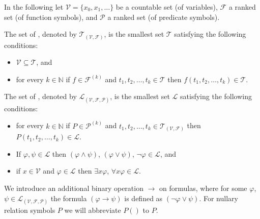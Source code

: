In the following let $\mathcal{V}=\{x_0,x_1,\dots\}$ be a countable set (of variables), $\mathcal{F}$ a ranked set (of function symbols), and $\mathcal{P}$ a ranked set (of predicate symbols).
\begin{definition}
	The set of , denoted by $\mathcal{T}_{(\mathcal{V},\mathcal{F})}$, is the smallest set $\mathcal{T}$ satisfying the following conditions:
	\begin{itemize}
		\item $\mathcal{V} \subseteq \mathcal{T}$, and
		\item for every $k\in\mathbb{N}$ if $f\in\mathcal{F}^{(k)}$ and $t_1,t_2,\dots,t_k\in\mathcal{T}$ then $f(t_1,t_2,\dots,t_k)\in\mathcal{T}$.
	\end{itemize}
	The set of , denoted by $\mathcal{L}_{(\mathcal{V},\mathcal{F},\mathcal{P})}$, is the smallest set $\mathcal{L}$ satisfying the following conditions:
	\begin{itemize}
		\item for every $k\in\mathbb{N}$ if $P\in\mathcal{P}^{(k)}$ and $t_1,t_2,\dots,t_k\in\mathcal{T}_{(\mathcal{V},\mathcal{F})}$ then $P(t_1,t_2,\dots,t_k)\in\mathcal{L}$.
		\item If $\varphi,\psi\in\mathcal{L}$ then $(\varphi\wedge\psi)$, $(\varphi\vee\psi)$, $\neg \varphi\in\mathcal{L}$, and
		\item if $x\in\mathcal{V}$ and $\varphi\in\mathcal{L}$ then $\exists x\varphi$, $\forall x\varphi\in\mathcal{L}$. %
	\end{itemize}
\end{definition}
We introduce an additional binary operation $\to$ on formulas, where for some $\varphi$, $\psi\in\mathcal{L}_{(\mathcal{V},\mathcal{F},\mathcal{P})}$ the formula $(\varphi\to\psi)$ is defined as $(\neg\varphi\vee\psi)$. For nullary relation symbols $P$ we will abbreviate $P()$ to $P$. 


